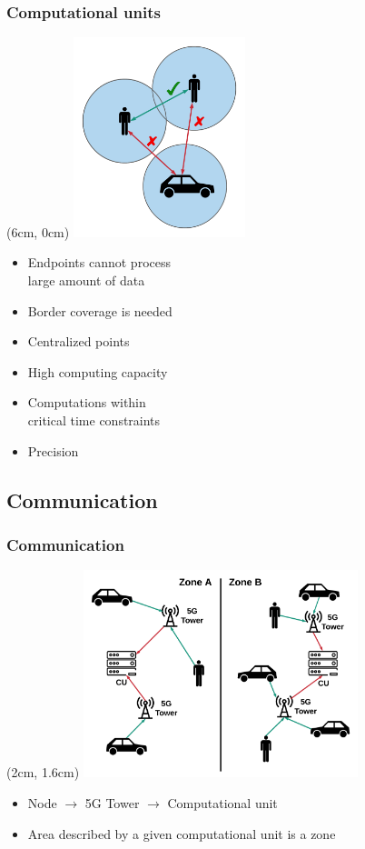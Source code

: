 \documentclass{beamer}
\begin{document}
\begin{frame}
    \frametitle{Computational units}
    \begin{textblock*}{5cm}(6cm, 0cm) %
        \includegraphics[width=5cm]{pics/Range of direct communication.png}
    \end{textblock*}
    \begin{itemize}
        \item Endpoints cannot process \\ large amount of data
        \item Border coverage is needed
        \item Centralized points
        \item High computing capacity
        \item Computations within \\ critical time constraints
        \item Precision
    \end{itemize}
\end{frame}

\subsection{Communication}

\begin{frame}[t]
    \frametitle{Communication}
    \begin{textblock*}{5cm}(2cm, 1.6cm) %
        \includegraphics[width=8cm]{pics/Communication.png}
    \end{textblock*}
    \begin{itemize}
        \item Node $\rightarrow$ 5G Tower $\rightarrow$ Computational unit
        \item Area described by a given computational unit is a zone
    \end{itemize}
\end{frame}
\end{document}
